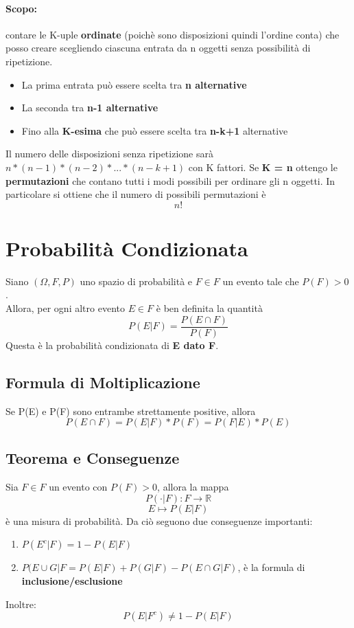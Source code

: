 \documentclass{report}
\begin{document}
\paragraph{Scopo:} contare le K-uple \textbf{ordinate} (poichè sono disposizioni quindi l'ordine conta) che posso creare scegliendo ciascuna entrata da n oggetti senza possibilità di ripetizione.
\begin{itemize}
    \item La prima entrata può essere scelta tra \textbf{n alternative}
    \item La seconda tra \textbf{n-1 alternative}
    \item Fino alla \textbf{K-esima} che può essere scelta tra \textbf{n-k+1} alternative
\end{itemize}
Il numero delle disposizioni senza ripetizione sarà \(n*(n-1)*(n-2)*...*(n-k+1)\) con K fattori. Se \textbf{K = n} ottengo le \textbf{permutazioni} che contano tutti i modi possibili per ordinare gli n oggetti. In particolare si ottiene che il numero di possibili permutazioni è \[n!\]
\section{Probabilità Condizionata}
Siano \((\Omega, \textit{F}, P)\) uno spazio di probabilità e \(F \in \textit{F}\) un evento tale che \(P(F) > 0\).\\
Allora, per ogni altro evento \(E \in \textit{F}\) è ben definita la quantità \[P(E|F) = \frac{P(E \cap F)}{P(F)}\] Questa è la probabilità condizionata di \textbf{E dato F}.
\subsection{Formula di Moltiplicazione}
Se P(E) e P(F) sono entrambe strettamente positive, allora \[P(E \cap F) = P(E|F)*P(F) = P(F|E)*P(E)\]
\subsection{Teorema e Conseguenze}
Sia \(F \in \textit{F}\) un evento con \(P(F) > 0\), allora la mappa \[P(\cdot |F): \textit{F} \xrightarrow{} \mathbb{R}\] \[E \longmapsto P(E|F)\] è una misura di probabilità. Da ciò seguono due conseguenze importanti: \begin{enumerate}
    \item \(P(E^c|F) = 1- P(E|F)\)
    \item \(P(E \cup G|F = P(E|F) + P(G|F) - P(E \cap G|F)\), è la formula di \textbf{inclusione/esclusione}
\end{enumerate}
Inoltre: \[P(E|F^c) \neq 1 - P(E|F)\]
\end{document}
